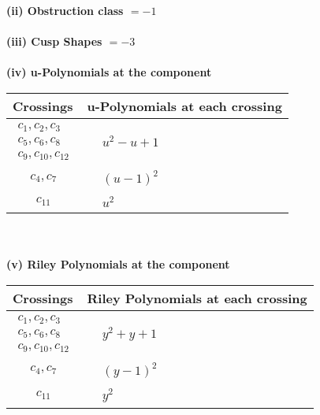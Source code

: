 \documentclass[1p]{elsarticle_modified}
\theoremstyle{definition}
\begin{document}
\flushleft \textbf{(ii) Obstruction class $= -1$}\\~\\
\flushleft \textbf{(iii) Cusp Shapes $= -3$}\\~\\
\newpage\renewcommand{\arraystretch}{1}
\flushleft \textbf{(iv) u-Polynomials at the component}\newline \\
\begin{tabular}{m{50pt}|m{274pt}}
Crossings & \hspace{64pt}u-Polynomials at each crossing \\
\hline $$\begin{aligned}c_{1},c_{2},c_{3}\\c_{5},c_{6},c_{8}\\c_{9},c_{10},c_{12}\end{aligned}$$&$\begin{aligned}
&u^2- u+1
\end{aligned}$\\
\hline $$\begin{aligned}c_{4},c_{7}\end{aligned}$$&$\begin{aligned}
&(u-1)^2
\end{aligned}$\\
\hline $$\begin{aligned}c_{11}\end{aligned}$$&$\begin{aligned}
&u^2
\end{aligned}$\\
\hline
\end{tabular}\\~\\
\newpage\renewcommand{\arraystretch}{1}
\flushleft \textbf{(v) Riley Polynomials at the component}\newline \\
\begin{tabular}{m{50pt}|m{274pt}}
Crossings & \hspace{64pt}Riley Polynomials at each crossing \\
\hline $$\begin{aligned}c_{1},c_{2},c_{3}\\c_{5},c_{6},c_{8}\\c_{9},c_{10},c_{12}\end{aligned}$$&$\begin{aligned}
&y^2+y+1
\end{aligned}$\\
\hline $$\begin{aligned}c_{4},c_{7}\end{aligned}$$&$\begin{aligned}
&(y-1)^2
\end{aligned}$\\
\hline $$\begin{aligned}c_{11}\end{aligned}$$&$\begin{aligned}
&y^2
\end{aligned}$\\
\hline
\end{tabular}\\~\\
\end{document}
